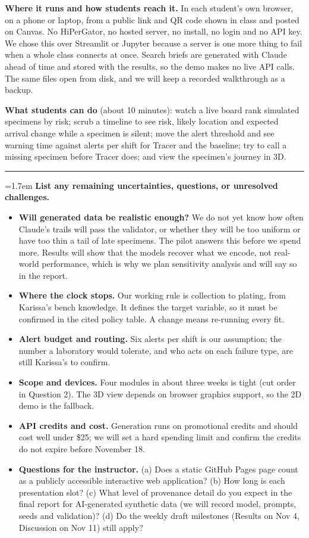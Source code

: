 \documentclass[10pt]{article}
\newcommand{\qa}[2]{%
  \par\Needspace{6\baselineskip}\addvspace{0.75em}%
  {\color{hair}\rule{\textwidth}{0.5pt}}\par\nopagebreak\vspace{0.15em}%
  \noindent\hangindent=1.7em\hangafter=1
  {\sffamily\bfseries\color{tracerteal}\makebox[1.7em][l]{#1}\color{black}#2}\par\nopagebreak\vspace{0.1em}}
\begin{document}
\textbf{Where it runs and how students reach it.} In each student's own browser, on a phone or laptop, from a public
link and QR code shown in class and posted on Canvas. No HiPerGator, no hosted server, no install, no login and no
API key. We chose this over Streamlit or Jupyter because a server is one more thing to fail when a whole class
connects at once. Search briefs are generated with Claude ahead of time and stored with the results, so the demo
makes no live API calls. The same files open from disk, and we will keep a recorded walkthrough as a backup.

\textbf{What students can do} (about 10 minutes): watch a live board rank simulated specimens by risk; scrub a
timeline to see risk, likely location and expected arrival change while a specimen is silent; move the alert
threshold and see warning time against alerts per shift for Tracer and the baseline; try to call a missing
specimen before Tracer does; and view the specimen's journey in 3D.

\qa{10.}{List any remaining uncertainties, questions, or unresolved challenges.}
\begin{itemize}
\item \textbf{Will generated data be realistic enough?} We do not yet know how often Claude's trails will pass
  the validator, or whether they will be too uniform or have too thin a tail of late specimens. The pilot
  answers this before we spend more. Results will show that the models recover what we encode, not real-world
  performance, which is why we plan sensitivity analysis and will say so in the report.
\item \textbf{Where the clock stops.} Our working rule is collection to plating, from Karissa's bench knowledge.
  It defines the target variable, so it must be confirmed in the cited policy table. A change means re-running
  every fit.
\item \textbf{Alert budget and routing.} Six alerts per shift is our assumption; the number a laboratory would
  tolerate, and who acts on each failure type, are still Karissa's to confirm.
\item \textbf{Scope and devices.} Four modules in about three weeks is tight (cut order in Question 2). The 3D view
  depends on browser graphics support, so the 2D demo is the fallback.
\item \textbf{API credits and cost.} Generation runs on promotional credits and should cost well under \$25; we
  will set a hard spending limit and confirm the credits do not expire before November 18.
\item \textbf{Questions for the instructor.} (a) Does a static GitHub Pages page count as a publicly accessible
  interactive web application? (b) How long is each presentation slot? (c) What level of provenance detail do you
  expect in the final report for AI-generated synthetic data (we will record model, prompts, seeds and validation)?
  (d) Do the weekly draft milestones (Results on Nov 4, Discussion on Nov 11) still apply?
\end{itemize}
\end{document}

